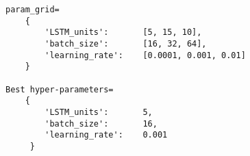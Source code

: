 \begin{lstlisting}
param_grid=
    {
        'LSTM_units':       [5, 15, 10],
        'batch_size':       [16, 32, 64],
        'learning_rate':    [0.0001, 0.001, 0.01]
    }

Best hyper-parameters=
    {
        'LSTM_units':       5,
        'batch_size':       16, 
        'learning_rate':    0.001
     }
\end{lstlisting}

